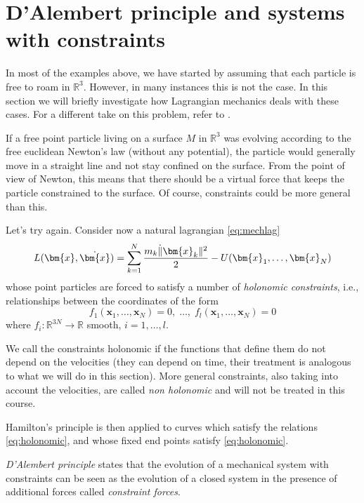 \documentclass[english,fontsize=11pt,paper=a5,oneside]{scrbook}
\newcommand{\R}{\mathbb{R}}
\newcommand{\bx}{\bm{x}}
\theoremstyle{definition}
\newenvironment{remark}
  {\pushQED{\qed}\renewcommand{\qedsymbol}{$\lozenge$}\remarkx}
  {\popQED\endremarkx}
\begin{document}
\section{D'Alembert principle and systems with constraints}\label{sec:LagrangeConstraints}

In most of the examples above, we have started by assuming that each particle is free to roam in $\R^3$.
However, in many instances this is not the case.
In this section we will briefly investigate how Lagrangian mechanics deals with these cases. For a different take on this problem, refer to \cite[Chapter 21]{book:arnold}.

If a free point particle living on a surface $M$ in $\R^3$ was evolving according to the free euclidean Newton's law (without any potential), the particle would generally move in a straight line and not stay confined on the surface.
From the point of view of Newton, this means that there should be a virtual force that keeps the particle constrained to the surface. Of course, constraints could be more general than this.

Let's try again. Consider now a natural lagrangian \eqref{eq:mechlag}
\begin{equation}
  L(\bx, \dot\bx) = \sum_{k=1}^N \frac{m_k \dot \|\bx_k\|^2}{2} - U(\bx_1, \ldots, \bx_N)
\end{equation}
whose point particles are forced to satisfy a number of \emph{holonomic constraints}, i.e., relationships between the coordinates of the form
\begin{equation}\label{eq:holonomic}
  f_1(\bx_1, \ldots,\bx_N) = 0, \;\ldots,\; f_l(\bx_1, \ldots,\bx_N) = 0
\end{equation}
where $f_i : \R^{3N}\to\R$ smooth, $i=1,\ldots,l$.

\begin{remark}
  We call the constraints holonomic if the functions that define them do not depend on the velocities (they can depend on time, their treatment is analogous to what we will do in this section). More general constraints, also taking into account the velocities, are called \emph{non holonomic} and will not be treated in this course.
\end{remark}

Hamilton's principle is then applied to curves which satisfy the relations \eqref{eq:holonomic}, and whose fixed end points satisfy \eqref{eq:holonomic}.

\begin{tcolorbox}
  \emph{D'Alembert principle} states that the evolution of a mechanical system with constraints can be seen as the evolution of a closed system in the presence of additional forces called \emph{constraint forces}.
\end{tcolorbox}
\end{document}
